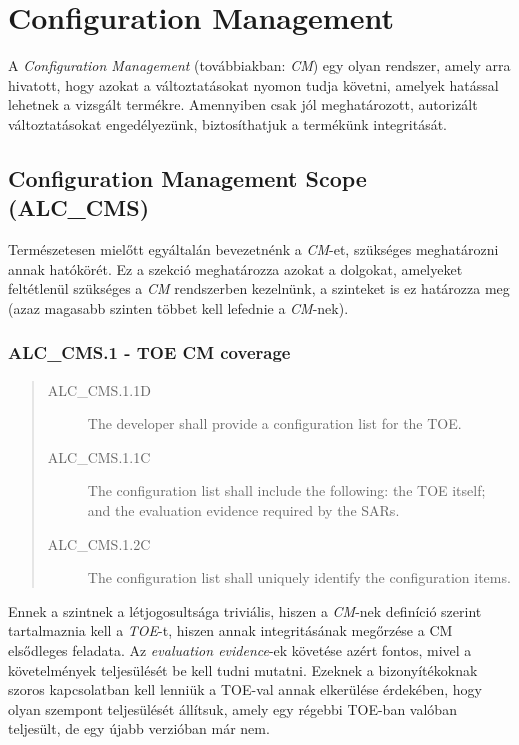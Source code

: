 \pagebreak[3]
\section{Configuration Management}
A \emph{Configuration Management} (továbbiakban: \emph{CM}) egy olyan rendszer, amely arra hivatott,
hogy azokat a változtatásokat nyomon tudja követni, amelyek hatással lehetnek a vizsgált termékre.
Amennyiben csak jól meghatározott, autorizált változtatásokat engedélyezünk, biztosíthatjuk a
termékünk integritását.

\subsection{Configuration Management Scope (ALC\_CMS)}
Természetesen mielőtt egyáltalán bevezetnénk a \emph{CM}-et, szükséges meghatározni annak hatókörét.
Ez a szekció meghatározza azokat a dolgokat, amelyeket feltétlenül szükséges a \emph{CM} rendszerben
kezelnünk, a szinteket is ez határozza meg (azaz magasabb szinten többet kell lefednie
a \emph{CM}-nek).

\pagebreak[3]
\subsubsection{ALC\_CMS.1 - TOE CM coverage}
\begin{quote}
    \begin{description}
        \item[ALC\_CMS.1.1D]{The developer shall provide a configuration list for the TOE.}
        \item[ALC\_CMS.1.1C]{The configuration list shall include the following: the TOE itself; and
            the evaluation evidence required by the SARs.}
        \item[ALC\_CMS.1.2C]{The configuration list shall uniquely identify the configuration
            items.}
    \end{description}
\end{quote}

Ennek a szintnek a létjogosultsága triviális, hiszen a \emph{CM}-nek definíció szerint tartalmaznia
kell a \emph{TOE}-t, hiszen annak integritásának megőrzése a CM elsődleges feladata. Az
\emph{evaluation evidence}-ek követése azért fontos, mivel a követelmények teljesülését be kell
tudni mutatni. Ezeknek a bizonyítékoknak szoros kapcsolatban kell lenniük a TOE-val annak elkerülése
érdekében, hogy olyan szempont teljesülését állítsuk, amely egy régebbi TOE-ban valóban teljesült,
de egy újabb verzióban már nem.

